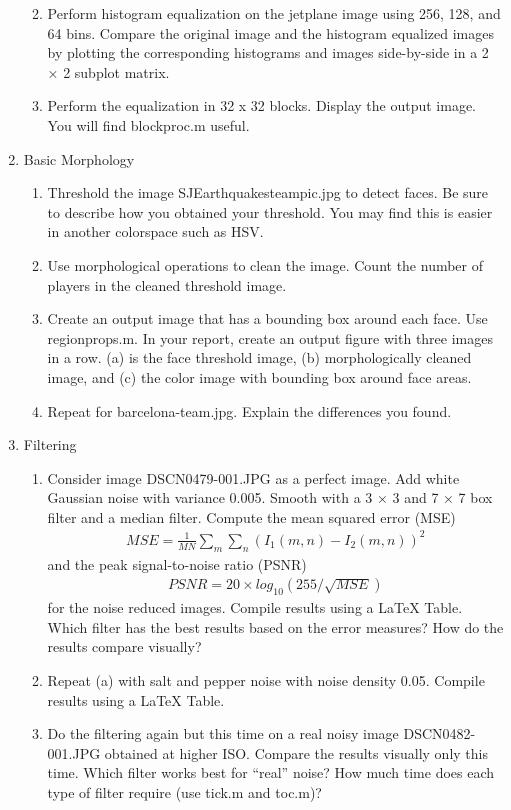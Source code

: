 \documentclass[12pt, letterpaper]{article}
\begin{document}
\begin{enumerate}
\begin{enumerate}
\begin{lstlisting}[language=Python]
	\end{lstlisting}
	\item Perform histogram equalization on the jetplane image using 256, 128, and 64 bins. Compare the original image and the histogram equalized images by plotting the corresponding histograms and images side-by-side in a 2 × 2 subplot matrix.
	\item Perform the equalization in 32 x 32 blocks. Display the output image. You will find blockproc.m useful.
	\end{enumerate}
\item Basic Morphology
	\begin{enumerate}
	\item Threshold the image SJEarthquakesteampic.jpg to detect faces. Be sure to describe
how you obtained your threshold. You may find this is easier in another colorspace such
as HSV.
	\item Use morphological operations to clean the image. Count the number of players in the
cleaned threshold image.
	\item  Create an output image that has a bounding box around each face. Use regionprops.m.
In your report, create an output figure with three images in a row. (a) is the face threshold image, (b) morphologically cleaned image, and (c) the color image with bounding
box around face areas.
	\item Repeat for barcelona-team.jpg. Explain the differences you found.
	\end{enumerate}
\item Filtering
	\begin{enumerate}
	\item Consider image DSCN0479-001.JPG as a perfect image. Add white Gaussian noise with
variance 0.005. Smooth with a 3 × 3 and 7 × 7 box filter and a median filter. Compute
the mean squared error (MSE)
	\begin{align*}
	MSE=\frac{1}{MN} \sum_{m} \sum_{n} (I_1(m,n)-I_2(m,n))^2
	\end{align*}
	and the peak signal-to-noise ratio (PSNR)
	\begin{align*}
	PSNR=20\times log_{10}(255/\sqrt{MSE})
	\end{align*}
	for the noise reduced images. Compile results using a \LaTeX{} Table. Which filter has the best results based on the error measures? How do the results compare visually?
	\item Repeat (a) with salt and pepper noise with noise density 0.05. Compile results using a \LaTeX{} Table.
	\item Do the filtering again but this time on a real noisy image DSCN0482-001.JPG obtained at higher ISO. Compare the results visually only this time. Which filter works best for ``real'' noise? How much time does each type of filter require (use tick.m and toc.m)?
	\end{enumerate}
\end{enumerate}
\end{document}
